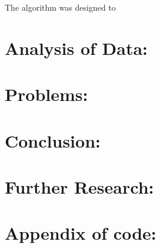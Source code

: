\documentclass[12pt]{article}
\begin{document}
The algorithm was designed to 

\section{Analysis of Data:}

\section{Problems:}

\section{Conclusion:}

\section{Further Research:}


\appendix
\section{Appendix of code:}




\end{document}
